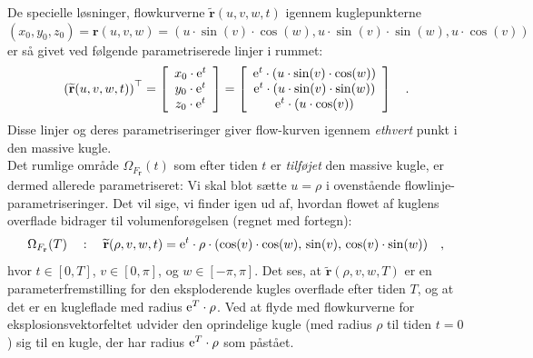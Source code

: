 De specielle løsninger, flowkurverne  $ \widetilde{\mathbf{r}}(u,v,w,t)$ igennem kuglepunkterne $(x_{0}, y_{0}, z_{0}) = \mathbf{r}(u,v,w) = (u\cdot\sin(v)\cdot \cos(w), u\cdot \sin(v)\cdot \sin(w), u\cdot \cos(v))$ er så givet ved følgende parametriserede linjer i rummet:
\begin{equation}
\left(\widetilde{\mathbf{r}}(u,v,w,t)\right)^{\top} = \left[
                                           \begin{array}{c}
                                                x_{0}\cdot \mathrm{e}^{t} \\
     y_{0}\cdot \mathrm{e}^{t} \\
     z_{0}\cdot \mathrm{e}^{t} \\
                                           \end{array}
                                         \right] = \left[
                                           \begin{array}{c}
                                              \mathrm{e}^{t}  \cdot (u\cdot\sin(v)\cdot \cos(w)) \\
    \mathrm{e}^{t}  \cdot ( u\cdot \sin(v)\cdot \sin(w))  \\
  \mathrm{e}^{t}  \cdot (u\cdot \cos(v))  \\
                                           \end{array}
                                         \right] \quad .
\end{equation}
Disse linjer og deres parametriseringer giver flow-kurven igennem \emph{ethvert} punkt i den massive kugle.\\


Det rumlige område  $\Omega_{F_{\mathbf{r}}}(t)$ som efter tiden $t$ er \emph{tilføjet} den massive kugle, er dermed allerede parametriseret: Vi skal blot sætte $u = \rho$ i ovenstående flowlinje-para\-me\-tri\-se\-rin\-ger. Det vil sige, vi finder igen ud af, hvordan flowet af kuglens overflade bidrager til volumenforøgelsen (regnet med fortegn):
 \begin{equation}
 \Omega_{F_{\mathbf{r}}}(T) \quad : \quad \widetilde{\mathbf{r}}(\rho,v,w, t) =
 \mathrm{e}^{t}  \cdot \rho \cdot (\cos(v)\cdot \cos(w), \, \sin(v), \, \cos(v)\cdot \sin(w) ) \quad ,
 \end{equation}
hvor $t \in [0, T]$, $v \in [0, \pi]$, og $w \in [-\pi, \pi]$. Det ses, at $\widetilde{\mathbf{r}}(\rho,v,w, T)$ er en parameterfremstilling for den eksploderende kugles overflade efter tiden $T$, og at det er en kugleflade med radius $\mathrm{e}^{T}\cdot \rho$.
Ved at flyde med flowkurverne for eksplosionsvektorfeltet udvider den oprindelige kugle (med radius $\rho$ til tiden $t=0$) sig til en kugle, der har radius $\mathrm{e}^{T}\cdot \rho$ som påstået.

